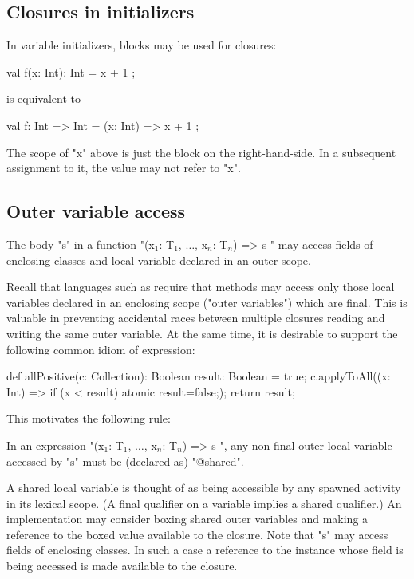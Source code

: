 \subsection{Closures in initializers}

In variable initializers, blocks may be used for closures:

\begin{xten}
val f(x: Int): Int = { x + 1 };
\end{xten}

is equivalent to

\begin{xten}
val f: Int => Int = (x: Int) => { x + 1 };
\end{xten}

The scope of \xcd"x" above is just the block on the
right-hand-side. In a
subsequent assignment to it, the value may not refer to \xcd"x".

\subsection{Outer variable access}

The body \xcd"s" in a function
\xcdmath"(x$_1$: T$_1$, $\dots$, x$_n$: T$_n$) => { s }"
may access fields
of enclosing classes and local variable declared in an outer scope.

Recall that languages such as \java{} require that methods may
access only those local variables declared in an enclosing scope
("outer variables") which are final. This is valuable in
preventing accidental races between multiple closures reading
and writing the same outer variable. At the same time, it is
desirable to support the following common idiom of expression:

\begin{xten}
def allPositive(c: Collection): Boolean {
  result: Boolean = true;
  c.applyToAll((x: Int) => { if (x < result) atomic {result=false;}});
  return result;
}
\end{xten}

This motivates the following rule:

\begin{staticrule*}
In an expression
\xcdmath"(x$_1$: T$_1$, $\dots$, x$_n$: T$_n$) => { s }",
any non-final outer local variable accessed by \xcd"s" must be (declared
as) \xcd"@shared".
\end{staticrule*}

A shared local variable is thought of as being accessible by any spawned
activity in its lexical scope. (A final qualifier on a variable implies
a shared qualifier.) An implementation may consider boxing shared outer
variables and making a reference to the boxed value available to the
closure. Note that \xcd"s" may access fields of enclosing classes. In such a
case a reference to the instance whose field is being accessed is made
available to the closure.

